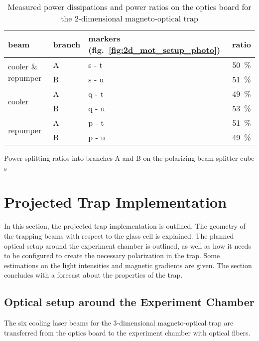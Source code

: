 \begin{table}
    \vspace{1cm}
    \begin{subtable}{0.65\textwidth}
        \centering
        \begin{tabular}{lllc}
            \toprule
            \textbf{beam} & \textbf{branch} & \textbf{markers} (fig.~\ref{fig:2d_mot_setup_photo}) & \textbf{ratio} \\
            \toprule
            \multirow{2}{*}{cooler \& repumper} & A & s - t & \SI{50}{\percent} \\
            & B & s - u & \SI{51}{\percent} \\
            \midrule
            \multirow{2}{*}{cooler} & A & q - t & \SI{49}{\percent} \\
            & B & q - u & \SI{53}{\percent} \\
            \midrule
            \multirow{2}{*}{repumper} & A & p - t & \SI{51}{\percent} \\
            & B & p - u & \SI{49}{\percent} \\
            \bottomrule
        \end{tabular}
        \caption{Power splitting ratios into branches A and B on the polarizing beam splitter cube s}
        \label{tab:power_splitting}
    \end{subtable}
    
    \caption{Measured power dissipations and power ratios on the optics board for the 2-dimensional magneto-optical trap}
    \label{tab:power_table}
\end{table} 


\section{Projected Trap Implementation}
In this section, the projected trap implementation is outlined. The geometry of the trapping beams with respect to the glass cell is explained. The planned optical setup around the experiment chamber is outlined, as well as how it needs to be configured to create the necessary polarization in the trap. Some estimations on the light intensities and magnetic gradients are given. The section concludes with a forecast about the properties of the trap.

\subsection*{Optical setup around the Experiment Chamber}
The six cooling laser beams for the 3-dimensional magneto-optical trap are transferred from the optics board to the experiment chamber with optical fibers. 

